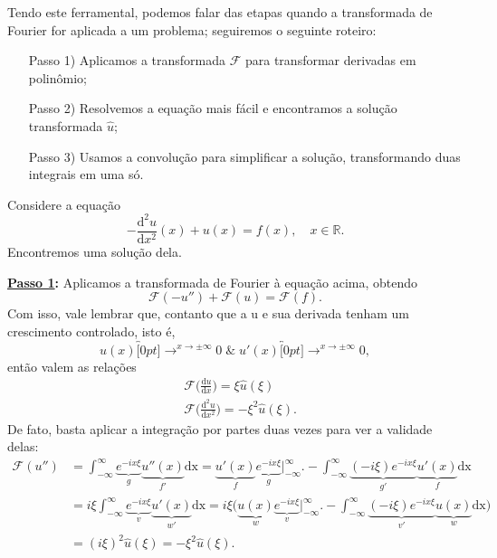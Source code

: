 \documentclass[../pde_notes.tex]{subfiles}
\begin{document}
Tendo este ferramental, podemos falar das etapas quando a transformada de Fourier for aplicada a um problema; seguiremos o seguinte roteiro:
\begin{itemize}
	\item[Passo 1)] Aplicamos a transformada \(\mathcal{F}\) para transformar derivadas em polinômio;
	\item[Passo 2)] Resolvemos a equação mais fácil e encontramos a solução transformada \(\hat{u}\);
	\item[Passo 3)] Usamos a convolução para simplificar a solução, transformando duas integrais em uma só.
\end{itemize}
\begin{example}
	Considere a equação
	\[
		-\frac{\mathrm{d}^{2}u}{\mathrm{d}x^{2}}(x) + u(x) = f(x),\quad x\in \mathbb{R}.
	\]
	Encontremos uma solução dela.

	\textbf{\underline{Passo 1}:} Aplicamos a transformada de Fourier à equação acima, obtendo
	\[
		\mathcal{F}(-u'') + \mathcal{F}(u) = \mathcal{F}(f).
	\]
	Com isso, vale lembrar que, contanto que a u e sua derivada tenham um crescimento controlado, isto é,
	\[
		u(x)\overbracket[0pt]{\longrightarrow}^{x\to \pm\infty}0 \;\&\; u'(x)\overbracket[0pt]{\longrightarrow}^{x\to \pm \infty}0,
	\]
	então valem as relações
	\begin{align*}
		 & \mathcal{F}\biggl(\frac{\mathrm{d}u}{\mathrm{d}x}\biggr) = \xi \hat{u}(\xi )               \\
		 & \mathcal{F}\biggl(\frac{\mathrm{d}^{2}u}{\mathrm{d}x^{2}}\biggr) = - \xi^{2}\hat{u}(\xi ).
	\end{align*}
	De fato, basta aplicar a integração por partes duas vezes para ver a validade delas:
	\begin{align*}
		\mathcal{F}(u'') & = \int_{-\infty}^{\infty}\underbrace{e^{-ix\xi }}_{g}\underbrace{u''(x)}_{f'} \mathrm{dx} = \underbrace{u'(x)}_{f}\underbrace{e^{-ix\xi }}_{g}\biggl|_{-\infty}^{\infty}\biggr. - \int_{-\infty}^{\infty}\underbrace{(-i\xi )e^{-ix\xi }}_{g'}\underbrace{u'(x)}_{f} \mathrm{dx}                      \\
		                 & = i\xi \int_{-\infty}^{\infty}\underbrace{e^{-ix\xi }}_{v}\underbrace{u'(x)}_{w'} \mathrm{dx} = i\xi \biggl(\underbrace{u(x)}_{w}\underbrace{e^{-ix\xi }}_{v}\biggl|_{-\infty}^{\infty}\biggr. - \int_{-\infty}^{\infty}\underbrace{(-i\xi )e^{-ix\xi }}_{v'}\underbrace{u(x)}_{w} \mathrm{dx}\biggr) \\
		                 & = (i\xi )^{2}\hat{u}(\xi ) = -\xi^{2}\hat{u}(\xi ).
	\end{align*}


\end{example}
\end{document}
